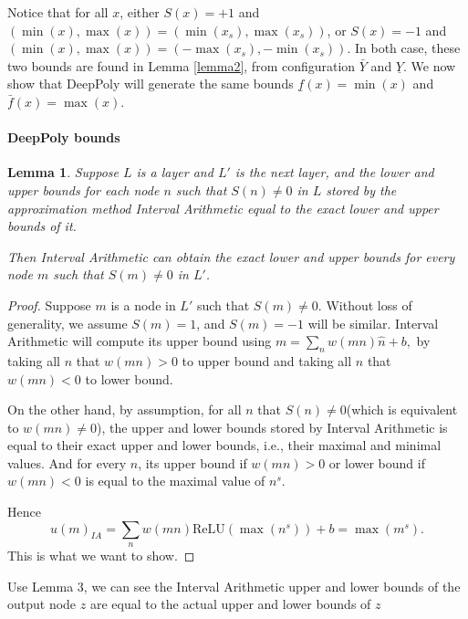 \documentclass[]{article}
\newtheorem{lemma}{Lemma}
\theoremstyle{definition}
\newcommand{\ReLU}{\mathrm{ReLU}}
\begin{document}
Notice that for all $x$, either $S(x)=+1$ and 
$(\min(x),\max(x))=(\min(x_s),\max(x_s))$, 
or $S(x)=-1$ and $(\min(x),\max(x))=(-\max(x_s),-\min(x_s))$.
In both case, these two bounds are found in Lemma \ref{lemma2},
from configuration $\bar{Y}$ and $\underline{Y}$.
We now show that DeepPoly will generate the same bounds 
$\underline{f}(x)=\min(x)$ and $\bar{f}(x)=\max(x)$.

\paragraph{DeepPoly bounds}


\begin{lemma}
	Suppose $L$ is a layer and $L'$ is the next layer, and  the lower and upper bounds for each node $n$ such that $S(n)\neq 0$ in $L$ stored by the approximation method Interval Arithmetic equal to the exact lower and upper bounds of it.
	
	 Then Interval Arithmetic can obtain the exact lower and upper bounds for every node $m$ such that $S(m)\neq 0$ in $L'$.
\end{lemma}

\begin{proof}
	Suppose $m$ is a node in $L'$ such that $S(m)\neq 0$. Without loss of generality, we assume $S(m)=1$, and $S(m)=-1$ will be similar. Interval Arithmetic will compute its upper bound using $m=\sum_{n}w(mn)\hat{n}+b,$ by taking all $n$ that $w(mn)>0$ to upper bound and taking all $n$ that $w(mn)<0$ to lower bound.
	
	On the other hand, by assumption, for all $n$ that $S(n)\neq 0$(which is equivalent to $w(mn)\neq 0$), the upper and lower bounds stored by Interval Arithmetic is equal to their exact upper and lower bounds, i.e., their maximal and minimal values. And for every $n$, its upper bound if $w(mn)>0$ or lower bound if $w(mn)<0$ is equal to the maximal value of $n^s$. 
	
	Hence $$u(m)_{IA}=\sum_{n}w(mn)\ReLU(\max(n^s))+b=\max(m^s).$$ This is what we want to show.
\end{proof}

Use Lemma 3, we can see the Interval Arithmetic upper and lower bounds of the output node $z$ are equal to the actual upper and lower bounds of $z$
\end{document}
